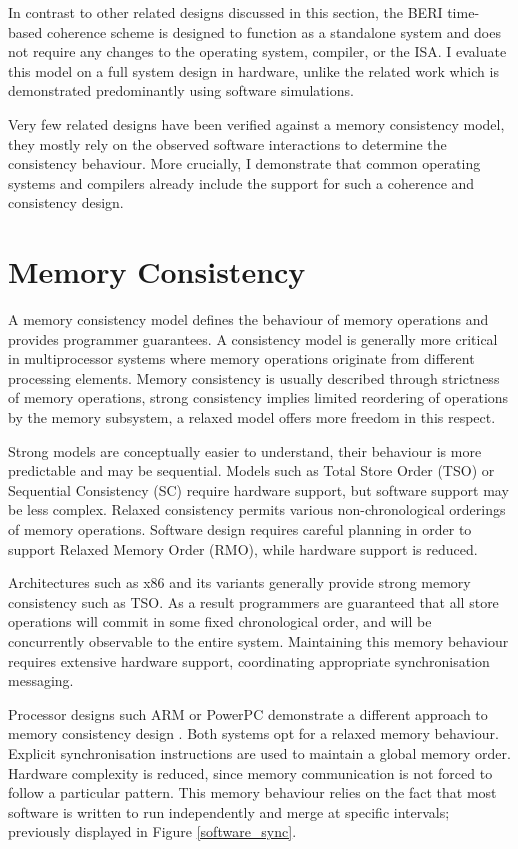				In contrast to other related designs discussed in this section, the BERI time-based coherence scheme is designed to function as a standalone system and does not require any changes to the operating system, compiler, or the ISA. I evaluate this model on a full system design in hardware, unlike the related work which is demonstrated predominantly using software simulations.
				
				Very few related designs have been verified against a memory consistency model, they mostly rely on the observed software interactions to determine the consistency behaviour. More crucially, I demonstrate that common operating systems and compilers already include the support for such a coherence and consistency design.

\section{Memory Consistency}
	\label{background_consistency}
		
	A memory consistency model defines the behaviour of memory operations and provides programmer guarantees. A consistency model is generally more critical in multiprocessor systems where memory operations originate from different processing elements. Memory consistency is usually described through strictness of memory operations, strong consistency implies limited reordering of operations by the memory subsystem, a relaxed model offers more freedom in this respect. 
	
	Strong models are conceptually easier to understand, their behaviour is more predictable and may be sequential. Models such as Total Store Order (TSO) or Sequential Consistency (SC) require hardware support, but software support may be less complex. Relaxed consistency permits various non-chronological orderings of memory operations. Software design requires careful planning in order to support Relaxed Memory Order (RMO), while hardware support is reduced.

	Architectures such as x86 and its variants generally provide strong memory consistency such as TSO. As a result programmers are guaranteed that all store operations will commit in some fixed chronological order, and will be concurrently observable to the entire system. Maintaining this memory behaviour requires extensive hardware support, coordinating appropriate synchronisation messaging.
	
	Processor designs such ARM or PowerPC demonstrate a different approach to memory consistency design \cite{Sarkar11,Maranget12}. Both systems opt for a relaxed memory behaviour. Explicit synchronisation instructions are used to maintain a global memory order. Hardware complexity is reduced, since memory communication is not forced to follow a particular pattern. This memory behaviour relies on the fact that most software is written to run independently and merge at specific intervals; previously displayed in Figure \ref{software_sync}.

